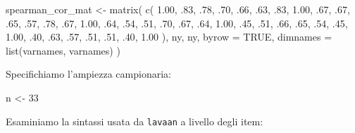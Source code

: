 \documentclass[
  11pt,
]{krantz}
\makeatletter
\newenvironment{Shaded}{\begin{snugshade}}{\end{snugshade}}
\newcommand{\AttributeTok}[1]{\textcolor[rgb]{0.61,0.61,0.61}{#1}}
\newcommand{\ConstantTok}[1]{\textcolor[rgb]{0,0,0}{#1}}
\newcommand{\DecValTok}[1]{\textcolor[rgb]{0.06,0.06,0.06}{#1}}
\newcommand{\FloatTok}[1]{\textcolor[rgb]{0.06,0.06,0.06}{#1}}
\newcommand{\FunctionTok}[1]{\textcolor[rgb]{0,0,0}{#1}}
\newcommand{\NormalTok}[1]{#1}
\newcommand{\OtherTok}[1]{\textcolor[rgb]{0.37,0.37,0.37}{#1}}
\newenvironment{kframe}{%
\medskip{}
\setlength{\fboxsep}{.8em}
 \def\at@end@of@kframe{}%
 \ifinner\ifhmode%
  \def\at@end@of@kframe{\end{minipage}}%
  \begin{minipage}{\columnwidth}%
 \fi\fi%
 \def\FrameCommand##1{\hskip\@totalleftmargin \hskip-\fboxsep
 \colorbox{shadecolor}{##1}\hskip-\fboxsep
     \hskip-\linewidth \hskip-\@totalleftmargin \hskip\columnwidth}%
 \MakeFramed {\advance\hsize-\width
   \@totalleftmargin\z@ \linewidth\hsize
   \@setminipage}}%
 {\par\unskip\endMakeFramed%
 \at@end@of@kframe}
\renewenvironment{Shaded}{\begin{kframe}}{\end{kframe}}
\theoremstyle{definition}
\theoremstyle{definition}
\theoremstyle{definition}
\theoremstyle{definition}
\theoremstyle{remark}
\makeatother
\begin{document}
\begin{Shaded}
\begin{Highlighting}[]
\NormalTok{spearman\_cor\_mat }\OtherTok{\textless{}{-}} \FunctionTok{matrix}\NormalTok{(}
  \FunctionTok{c}\NormalTok{(}
    \FloatTok{1.00}\NormalTok{, .}\DecValTok{83}\NormalTok{, .}\DecValTok{78}\NormalTok{, .}\DecValTok{70}\NormalTok{, .}\DecValTok{66}\NormalTok{, .}\DecValTok{63}\NormalTok{,}
\NormalTok{    .}\DecValTok{83}\NormalTok{, }\FloatTok{1.00}\NormalTok{, .}\DecValTok{67}\NormalTok{, .}\DecValTok{67}\NormalTok{, .}\DecValTok{65}\NormalTok{, .}\DecValTok{57}\NormalTok{,}
\NormalTok{    .}\DecValTok{78}\NormalTok{, .}\DecValTok{67}\NormalTok{, }\FloatTok{1.00}\NormalTok{, .}\DecValTok{64}\NormalTok{, .}\DecValTok{54}\NormalTok{, .}\DecValTok{51}\NormalTok{,}
\NormalTok{    .}\DecValTok{70}\NormalTok{, .}\DecValTok{67}\NormalTok{, .}\DecValTok{64}\NormalTok{, }\FloatTok{1.00}\NormalTok{, .}\DecValTok{45}\NormalTok{, .}\DecValTok{51}\NormalTok{,}
\NormalTok{    .}\DecValTok{66}\NormalTok{, .}\DecValTok{65}\NormalTok{, .}\DecValTok{54}\NormalTok{, .}\DecValTok{45}\NormalTok{, }\FloatTok{1.00}\NormalTok{, .}\DecValTok{40}\NormalTok{,}
\NormalTok{    .}\DecValTok{63}\NormalTok{, .}\DecValTok{57}\NormalTok{, .}\DecValTok{51}\NormalTok{, .}\DecValTok{51}\NormalTok{, .}\DecValTok{40}\NormalTok{, }\FloatTok{1.00}
\NormalTok{  ),}
\NormalTok{  ny, ny,}
  \AttributeTok{byrow =} \ConstantTok{TRUE}\NormalTok{,}
  \AttributeTok{dimnames =} \FunctionTok{list}\NormalTok{(varnames, varnames)}
\NormalTok{)}
\end{Highlighting}
\end{Shaded}

Specifichiamo l'ampiezza campionaria:

\begin{Shaded}
\begin{Highlighting}[]
\NormalTok{n }\OtherTok{\textless{}{-}} \DecValTok{33}
\end{Highlighting}
\end{Shaded}

Esaminiamo la sintassi usata da \texttt{lavaan} a livello degli item:
\end{document}
